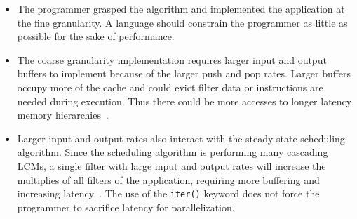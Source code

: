 \begin{itemize}

\item The programmer grasped the algorithm and implemented the
  application at the fine granularity.  A language should constrain
  the programmer as little as possible for the sake of performance.

\item The coarse granularity implementation requires larger input and
output buffers to implement because of the larger push and pop rates.
Larger buffers occupy more of the cache and could evict filter data or
instructions are needed during execution.  Thus there could be more
accesses to longer latency memory hierarchies~\cite{sermulins-lctes05}.

\item Larger input and output rates also interact with the
  steady-state scheduling algorithm.  Since the scheduling algorithm
  is performing many cascading LCMs, a single filter with large input
  and output rates will increase the multiplies of all filters of the
  application, requiring more buffering and increasing
  latency~\cite{karczmarek-lctes03}.  The use of the {\tt iter()}
  keyword does not force the programmer to sacrifice latency for
  parallelization.

\end{itemize}

